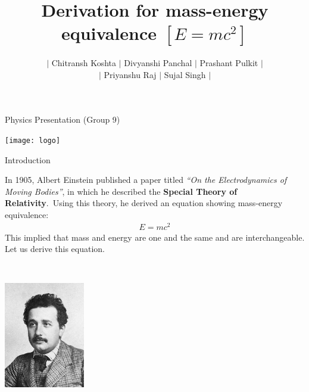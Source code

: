 \documentclass[11pt]{beamer}
\title[Derivation for mass-energy equivalence] {Derivation for mass-energy equivalence $[E = mc^2]$}
\author[Chitransh, Divyanshi, Prashant...]
{\(|\) Chitransh Koshta \(|\) Divyanshi Panchal \(|\) Prashant Pulkit \(|\)\\\(|\) Priyanshu Raj
    \(|\) Sujal Singh \(|\)}
\date[Priyanshu, Sujal]{}
\begin{document}
    \begin{frame}{Physics Presentation (Group 9)}
        \begin{center}
            \texttt{[image: logo]}
        \end{center}\vspace*{-20pt}
        \maketitle
    \end{frame}

    \begin{frame}[t]{Introduction}
        \begin{minipage}[t]{0.65\textwidth}
            In 1905, Albert Einstein published a paper titled \textit{``On the Electrodynamics of Moving Bodies''},
            in which he described the \textbf{Special Theory of Relativity}.\ Using this theory, he derived an equation
            showing mass-energy equivalence:
            \begin{align*}
                E = mc^2
            \end{align*}
            This implied that mass and energy are one and the same and are interchangeable.\\[10pt]
            Let us derive this equation.
        \end{minipage}
        \begin{minipage}[t]{0.05\textwidth}
            ~
        \end{minipage}
        \begin{minipage}[t]{0.1\textwidth}
            \begin{center}
                \vspace*{-10pt}
                \includegraphics[width=100pt]{albert}
            \end{center}
        \end{minipage}
    \end{frame}
\end{document}
